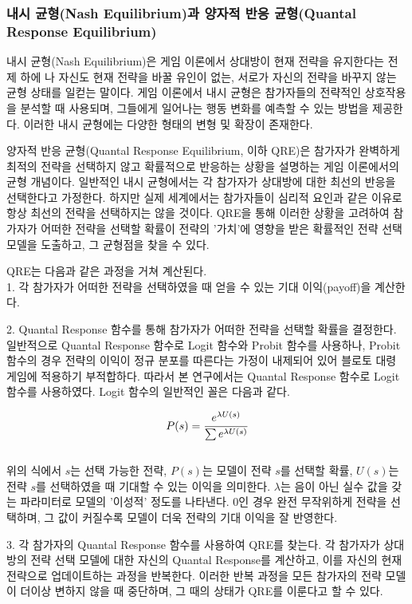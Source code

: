 \subsubsection{내시 균형(Nash Equilibrium)과 양자적 반응 균형(Quantal Response Equilibrium)}
내시 균형(Nash Equilibrium)은 게임 이론에서 상대방이 현재 전략을 유지한다는 전제 하에 나 자신도 현재 전략을 바꿀 유인이 없는, 서로가 자신의 전략을 바꾸지 않는 균형 상태를 일컫는 말이다. 게임 이론에서 내시 균형은 참가자들의 전략적인 상호작용을 분석할 때 사용되며, 그들에게 일어나는 행동 변화를 예측할 수 있는 방법을 제공한다. 이러한 내시 균형에는 다양한 형태의 변형 및 확장이 존재한다.

양자적 반응 균형(Quantal Response Equilibrium, 이하 QRE)은 참가자가 완벽하게 최적의 전략을 선택하지 않고 확률적으로 반응하는 상황을 설명하는 게임 이론에서의 균형 개념이다. 일반적인 내시 균형에서는 각 참가자가 상대방에 대한 최선의 반응을 선택한다고 가정한다. 하지만 실제 세계에서는 참가자들이 심리적 요인과 같은 이유로 항상 최선의 전략을 선택하지는 않을 것이다. QRE을 통해 이러한 상황을 고려하여 참가자가 어떠한 전략을 선택할 확률이 전략의 '가치'에 영향을 받은 확률적인 전략 선택 모델을 도출하고, 그 균형점을 찾을 수 있다.

QRE는 다음과 같은 과정을 거쳐 계산된다.
\\
1. 각 참가자가 어떠한 전략을 선택하였을 때 얻을 수 있는 기대 이익(payoff)을 계산한다.

2. Quantal Response 함수를 통해 참가자가 어떠한 전략을 선택할 확률을 결정한다. 일반적으로 Quantal Response 함수로 Logit 함수와 Probit 함수를 사용하나, Probit 함수의 경우 전략의 이익이 정규 분포를 따른다는 가정이 내제되어 있어 블로토 대령 게임에 적용하기 부적합하다. 따라서 본 연구에서는 Quantal Response 함수로 Logit 함수를 사용하였다. Logit 함수의 일반적인 꼴은 다음과 같다.

$$
P(s)=\cfrac{e^{\lambda U(s)}}{\sum e^{\lambda U(s)}}
$$
\\
위의 식에서 $s$는 선택 가능한 전략, $P(s)$는 모델이 전략 $s$를 선택할 확률, $U(s)$는 전략 $s$를 선택하였을 때 기대할 수 있는 이익을 의미한다. $\lambda$는 음이 아닌 실수 값을 갖는 파라미터로 모델의 '이성적' 정도를 나타낸다. 0인 경우 완전 무작위하게 전략을 선택하며, 그 값이 커질수록 모델이 더욱 전략의 기대 이익을 잘 반영한다.

3. 각 참가자의 Quantal Response 함수를 사용하여 QRE를 찾는다. 각 참가자가 상대방의 전략 선택 모델에 대한 자신의 Quantal Response를 계산하고, 이를 자신의 현재 전략으로 업데이트하는 과정을 반복한다. 이러한 반복 과정을 모든 참가자의 전략 모델이 더이상 변하지 않을 때 중단하며, 그 때의 상태가 QRE를 이룬다고 할 수 있다.